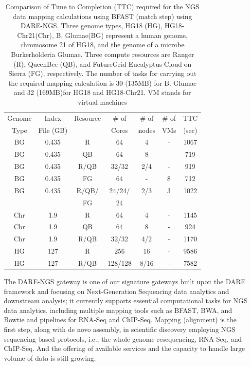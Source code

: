 \documentclass[]{svjour3}
\begin{document}
\begin{table}
\centering
\scriptsize
 \begin{tabular}{|c|c|c|c|c|c|c|} 
 \hline 
Genome & Index         & Resource    & \# of & \# of &   \# of         &	TTC  \\
  Type               & File (GB)        & &Cores &   nodes &  VMs&  (sec)\\  
  \hline
 BG &0.435& R&	64 &4&-	&1067 \\
\hline                  
BG &0.435& QB	&	64& 8&-	&719 \\
\hline
 BG &0.435&R/QB	&	32/32 &2/4& -&919 \\
\hline
 BG &0.435& FG &	64 &-&8	&712 \\
\hline
 BG &0.435 &  R/QB/ &	24/24/& 2/3 & 3 &1022\\
 & & FG& 24 &&&\\
\hline
\hline
Chr &1.9& R	&	64& 4 &-&1145 \\
\hline
Chr &1.9& QB	&	64&8&-	&924 \\
\hline
Chr &1.9& R/QB	&	32/32& 4/2&	-&1170 \\
\hline
\hline
HG &127& R	&	256 & 16 &-	&9586\\
\hline
HG &127& R/QB	&	128/128&8/16 & -&7582 \\
\hline
\end{tabular}
\caption{
  Comparison of Time to Completion (TTC) required for the NGS data
  mapping calculations using BFAST (match step) using DARE-NGS. 
  Three genome types,
  HG18 (HG), HG18-Chr21(Chr), B. Glumae(BG) represent a human genome,
  chromosome 21 of HG18, and the genome of a microbe Burkerholderia
  Glumae. Three compute resources are Ranger (R), QueenBee (QB), and
  FutureGrid  Eucalyptus Cloud on Sierra (FG), respectively. The
  number of tasks for carrying out the required mapping calculation is
  30 (135MB) for B. Glumae and 32 (169MB)for HG18 and HG18-Chr21. VM stands for virtual machines
}

  \label{table:NGS-Distributed} 
\end{table}

The DARE-NGS gateway %
is one of our signature gateways built upon the DARE framework and focusing on
Next-Generation Sequencing data analytics and downstream analysis; it
currently supports essential computational tasks for NGS data analytics, including multiple mapping tools such as  BFAST, BWA, and Bowtie and pipelines for RNA-Seq and ChIP-Seq\cite{mardis2008-arghg,ecmls_ccpe10}. Mapping (alignment) is the first step, along with de novo assembly, in scientific discovery employing NGS sequencing-based protocols, i.e., the whole genome resequencing, RNA-Seq, and ChIP-Seq.  And the offering of available services and the capacity to handle large volume of data is still growing.
\end{document}
